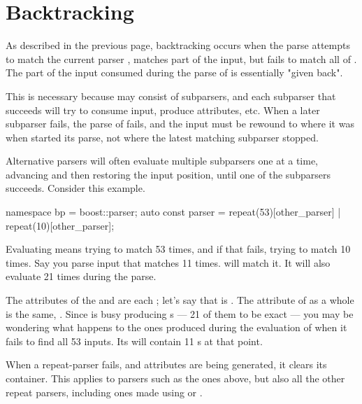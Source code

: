 \documentclass{MyBook}
\begin{document}
\section{Backtracking}

As described in the previous page, backtracking occurs when the parse attempts to match the current parser , matches part of the input, but fails to match all of . The part of the input consumed during the parse of  is essentially "given back".

This is necessary because  may consist of subparsers, and each subparser that succeeds will try to consume input, produce attributes, etc. When a later subparser fails, the parse of  fails, and the input must be rewound to where it was when  started its parse, not where the latest matching subparser stopped.

Alternative parsers will often evaluate multiple subparsers one at a time, advancing and then restoring the input position, until one of the subparsers succeeds. Consider this example.

\begin{code}
namespace bp = boost::parser;
auto const parser = repeat(53)[other_parser] | repeat(10)[other_parser];
\end{code}

Evaluating  means trying to match  53 times, and if that fails, trying to match  10 times. Say you parse input that matches  11 times.  will match it. It will also evaluate  21 times during the parse.

The attributes of the  and  are each \emph{}; let's say that \emph{} is . The attribute of  as a whole is the same, . Since  is busy producing s --- 21 of them to be exact --- you may be wondering what happens to the ones produced during the evaluation of  when it fails to find all 53 inputs. Its  will contain 11 s at that point.

When a repeat-parser fails, and attributes are being generated, it clears its container. This applies to parsers such as the ones above, but also all the other repeat parsers, including ones made using  or .
\end{document}
